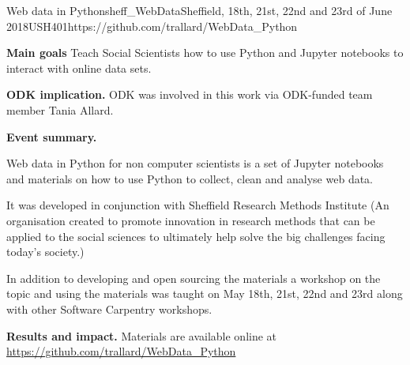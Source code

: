 \begin{event}{Web data in Python}{sheff_WebData}{Sheffield, 18th, 21st, 22nd and 23rd of June 2018}{USH}{40}{1}{https://github.com/trallard/WebData_Python}

\textbf{Main goals} Teach Social Scientists how to use Python and Jupyter notebooks to interact with online data sets.

\textbf{ODK implication.} ODK was involved in this work via ODK-funded team member Tania Allard.

\textbf{Event summary.}

Web data in Python for non computer scientists is a set of Jupyter notebooks and materials on how to use Python to collect, clean and analyse web data.

 It was developed in conjunction with Sheffield Research Methods Institute (An organisation created to promote innovation in research methods that can be applied to the social sciences to ultimately help solve the big challenges facing today’s society.)

In addition to developing and open sourcing the materials a workshop on the topic and using the materials was taught on May 18th, 21st, 22nd and 23rd along with other Software Carpentry workshops.

\textbf{Results and impact.} Materials are available online at \url{https://github.com/trallard/WebData_Python}

\end{event}
